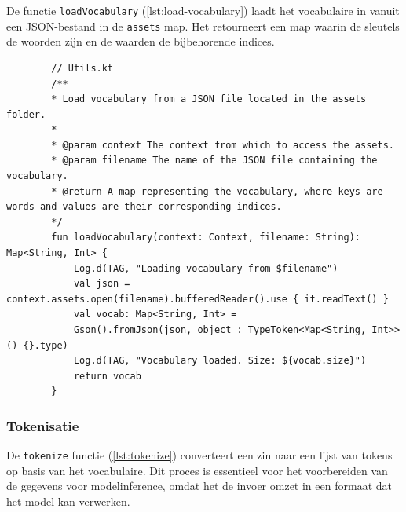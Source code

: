 De functie \texttt{loadVocabulary} (\ref{lst:load-vocabulary}) laadt het vocabulaire in vanuit een JSON-bestand in de \texttt{assets} map. Het retourneert een map waarin de sleutels de woorden zijn en de waarden de bijbehorende indices.

\begin{listing}
    \begin{verbatim}
        // Utils.kt
        /**
        * Load vocabulary from a JSON file located in the assets folder.
        *
        * @param context The context from which to access the assets.
        * @param filename The name of the JSON file containing the vocabulary.
        * @return A map representing the vocabulary, where keys are words and values are their corresponding indices.
        */
        fun loadVocabulary(context: Context, filename: String): Map<String, Int> {
            Log.d(TAG, "Loading vocabulary from $filename")
            val json = context.assets.open(filename).bufferedReader().use { it.readText() }
            val vocab: Map<String, Int> =
            Gson().fromJson(json, object : TypeToken<Map<String, Int>>() {}.type)
            Log.d(TAG, "Vocabulary loaded. Size: ${vocab.size}")
            return vocab
        }
    \end{verbatim}
    \caption[\texttt{loadVocabulary}]{De \texttt{loadVocabulary} functie laadt het vocabulaire vanuit een JSON-bestand in de \texttt{assets} map en retourneert een map van woorden en hun indices.}
    \label{lst:load-vocabulary}
\end{listing}

\subsubsection{Tokenisatie}

De \texttt{tokenize} functie (\ref{lst:tokenize}) converteert een zin naar een lijst van tokens op basis van het vocabulaire. Dit proces is essentieel voor het voorbereiden van de gegevens voor modelinference, omdat het de invoer omzet in een formaat dat het model kan verwerken.

